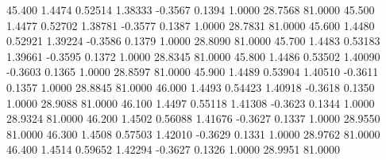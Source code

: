   45.400   1.4474   0.52514   1.38333  -0.3567   0.1394   1.0000  28.7568  81.0000
  45.500   1.4477   0.52702   1.38781  -0.3577   0.1387   1.0000  28.7831  81.0000
  45.600   1.4480   0.52921   1.39224  -0.3586   0.1379   1.0000  28.8090  81.0000
  45.700   1.4483   0.53183   1.39661  -0.3595   0.1372   1.0000  28.8345  81.0000
  45.800   1.4486   0.53502   1.40090  -0.3603   0.1365   1.0000  28.8597  81.0000
  45.900   1.4489   0.53904   1.40510  -0.3611   0.1357   1.0000  28.8845  81.0000
  46.000   1.4493   0.54423   1.40918  -0.3618   0.1350   1.0000  28.9088  81.0000
  46.100   1.4497   0.55118   1.41308  -0.3623   0.1344   1.0000  28.9324  81.0000
  46.200   1.4502   0.56088   1.41676  -0.3627   0.1337   1.0000  28.9550  81.0000
  46.300   1.4508   0.57503   1.42010  -0.3629   0.1331   1.0000  28.9762  81.0000
  46.400   1.4514   0.59652   1.42294  -0.3627   0.1326   1.0000  28.9951  81.0000
